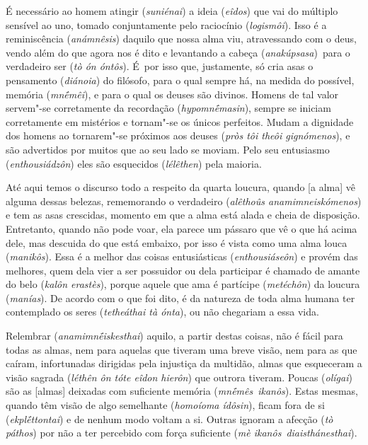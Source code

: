 É necessário ao homem atingir (\emph{suniénai}) a ideia (\emph{eîdos})
que vai do múltiplo sensível ao uno, tomado conjuntamente pelo
raciocínio (\emph{logismôi}). \bekker{[249c]} Isso é a reminiscência
(\emph{anámnêsis}) daquilo que nossa alma viu, atravessando com o deus,
vendo além do que agora nos é dito e levantando a cabeça
(\emph{anakúpsasa})~para o verdadeiro ser (\emph{tò ón óntôs}). É~por
isso que, justamente, só cria asas o pensamento (\emph{diánoia}) do
filósofo, para o qual sempre há, na medida do possível, memória
(\emph{mnḗmêi}), e para o qual os deuses são divinos. Homens de tal
valor servem"-se corretamente da recordação (\emph{hypomnḗmasin}), sempre
se iniciam corretamente em mistérios e tornam"-se os únicos perfeitos.
Mudam a dignidade dos homens ao tornarem"-se próximos aos deuses
(\emph{pròs tôi theôi gignómenos}), e são advertidos por muitos que ao
seu lado se moviam. Pelo seu entusiasmo \bekker{[249d]}
(\emph{enthousiádzôn}) eles são esquecidos (\emph{lélêthen}) pela
maioria.

Até aqui temos o discurso todo a respeito da quarta loucura, quando [a
alma] vê alguma dessas belezas, rememorando o verdadeiro
(\emph{alêthoûs anamimneiskómenos}) e tem as asas crescidas, momento em
que a alma está alada e cheia de disposição. Entretanto, quando não pode
voar, ela parece um pássaro que vê o que há acima dele, mas descuida do
que está embaixo, por isso é vista como uma alma louca (\emph{manikôs}).
\bekker{[249e]} Essa é a melhor das coisas entusiásticas
(\emph{enthousiáseôn}) e provém das melhores, quem dela vier a ser
possuidor ou dela participar é chamado de amante do belo (\emph{kalôn
erastès}), porque aquele que ama é partícipe (\emph{metéchôn}) da
loucura (\emph{manías}). De acordo com o que foi dito, é da natureza de
toda alma humana ter contemplado os seres (\emph{tetheáthai tà ónta}),
ou não chegariam a essa vida.

\bekker{[250a]} Relembrar (\emph{anamimnḗiskesthai}) aquilo, a partir destas
coisas, não é fácil para todas as almas, nem para aquelas que tiveram
uma breve visão, nem para as que caíram, infortunadas dirigidas pela
injustiça da multidão, almas que esqueceram a visão sagrada
(\emph{léthên ôn tóte eîdon hierôn}) que outrora tiveram. Poucas
(\emph{olígai}) são as [almas] deixadas com suficiente memória
(\emph{mnḗmês}~\emph{ikanôs}). Estas mesmas, quando têm visão de algo
semelhante (\emph{homoíoma ídôsin}), ficam fora de si
(\emph{ekplḗttontai}) e de nenhum modo voltam a si. Outras ignoram a
afecção (\emph{tò páthos}) por não a ter percebido com força suficiente
(\emph{mè ikanôs}~\emph{diaisthánesthai}).

